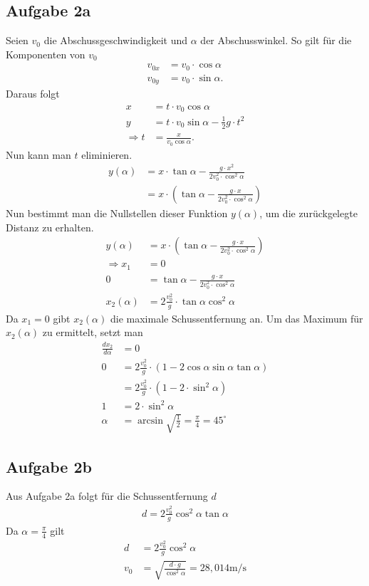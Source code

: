 \documentclass[a4paper,11pt]{article}
\begin{document}
\subsection*{Aufgabe 2a}
Seien $v_0$ die Abschussgeschwindigkeit und $\alpha$ der Abschusswinkel. So gilt für die Komponenten von $v_0$
\begin{align*}
  v_{0x} &= v_0 \cdot \cos\alpha\\
  v_{0y} &= v_0 \cdot \sin\alpha \mbox{.}
\end{align*}
Daraus folgt 
\begin{align*}
  x &= t \cdot v_0 \cos\alpha \\
  y &= t \cdot v_0 \sin\alpha - \frac{1}{2}g \cdot t^2 \\
  \Rightarrow t &= \frac{x}{v_0 \cos\alpha} \mbox{.}
\end{align*}
Nun kann man $t$ eliminieren.
\begin{align*}
  y(\alpha) &= x \cdot\tan\alpha - \frac{g \cdot x^2}{2v_0^2\cdot\cos^2\alpha} \\
  &= x \cdot\left(\tan\alpha - \frac{g \cdot x}{2v_0^2\cdot\cos^2\alpha}\right)
\end{align*}
Nun bestimmt man die Nullstellen dieser Funktion $y(\alpha)$, um die zurückgelegte Distanz zu erhalten.
\begin{align*}
  y(\alpha) &= x\cdot\left(\tan\alpha - \frac{g \cdot x}{2v_0^2\cdot\cos^2\alpha}\right) \\
  \Rightarrow x_1 &= 0 \\
  0 &=\tan\alpha - \frac{g \cdot x}{2v_0^2\cdot\cos^2\alpha} \\
  x_2(\alpha) &= 2\frac{v_0^2}{g} \cdot\tan\alpha\cos^2\alpha
\end{align*}
Da $x_1=0$ gibt $x_2(\alpha)$ die maximale Schussentfernung an. Um das Maximum für $x_2(\alpha)$ zu ermittelt, setzt man 
\begin{align*}
  \frac{dx_2}{d\alpha} &= 0\\
  0 &= 2\frac{v_0^2}{g}\cdot\left(1 - 2\cos\alpha\sin\alpha\tan\alpha\right)\\
  &= 2\frac{v_0^2}{g} \cdot\left(1 - 2\cdot\sin^2\alpha\right)\\
  1 &= 2\cdot\sin^2\alpha \\
  \alpha &= \arcsin\sqrt{\frac{1}{2}} = \frac{\pi}{4}=45^\circ
\end{align*}

\subsection*{Aufgabe 2b}
Aus Aufgabe 2a folgt für die Schussentfernung $d$
\begin{align*}
  d = 2\frac{v_0^2}{g} \cos^2\alpha\tan\alpha
\end{align*}
Da $\alpha = \frac{\pi}{4}$ gilt 
\begin{align*}
  d &= 2\frac{v_0^2}{g} \cos^2\alpha\\
  v_0 &= \sqrt{\frac{d\cdot g}{\cos^2\alpha}} = 28,014 \mbox{m/s}
\end{align*}
\end{document}
